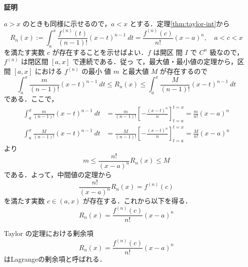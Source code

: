 \documentclass[10pt, uplatex, dvipdfmx]{jsarticle}
\makeatletter
\renewenvironment{proof}[1][\proofname]{\par
  \pushQED{\qed}%
  \normalfont \topsep6\p@\@plus6\p@\relax
  \trivlist
  \item\relax
  {\bfseries
  #1\@addpunct{.}}\hspace\labelsep\ignorespaces
}{%
  \popQED\endtrivlist\@endpefalse
}
\theoremstyle{definition}
\renewcommand{\proofname}{\textbf{証明}}
\numberwithin{equation}{section}
\makeatother
\begin{document}
\begin{proof}
  $a>x$ のときも同様に示せるので，$a<x$ とする．定理\ref{thm:taylor-int}から
  \[
    R_n(x):=\int_{a}^{x}\frac{f^{(n)}(t)}{(n-1)!}(x-t)^{n-1}\ dt =
    \frac{f^{(n)}(c)}{n!}(x-a)^n, \quad a<c<x
  \]
  を満たす実数 $c$ が存在することを示せばよい．$f$ は開区
  間 $I$ で $C^n$ 級なので，$f^{(n)}$ は閉区間 $[a,x]$ で連続である．従っ
  て，最大値・最小値の定理から，区間 $[a,x]$ における $f^{(n)}$ の最小
  値 $m$ と最大値 $M$ が存在するので
  \[
    \int_{a}^{x} \frac{m}{(n-1)!}(x-t)^{n-1}\ dt
    \leq R_n(x)
    \leq \int_{a}^{x} \frac{M}{(n-1)!}(x-t)^{n-1}\ dt
  \]
  である．ここで，
  \[
    \begin{aligned}
      \int_{a}^{x}\frac{m}{(n-1)!}(x-t)^{n-1}\ dt
      &= \frac{m}{(n-1)!}\left[ -\frac{(x-t)^{n}}{n}\right]_{t=a}^{t=x}
      =\frac{m}{n!}(x-a)^n\\ 
      \int_{a}^{x}\frac{M}{(n-1)!}(x-t)^{n-1}\ dt
      &=\frac{M}{(n-1)!}\left[ -\frac{(x-t)^{n}}{n}\right]_{t=a}^{t=x}=\frac{M}{n!}(x-a)^n
    \end{aligned}
  \]
  より
  \[
    m \leq \frac{n!}{(x-a)^n} R_n(x) \leq M
  \]
  である．よって，中間値の定理から
  \[
    \frac{n!}{(x-a)^n}R_n(x) =f^{(n)}(c)
  \]
  を満たす実数 $c \in (a,x)$ が存在する．これから以下を得る．
  \[
    R_n(x) = \frac{f^{(n)}(c)}{n!}(x-a)^n
  \]
\end{proof}

Taylor の定理における剰余項
\[
  R_n(x) = \frac{f^{(n)}(c)}{n!}(x-a)^n
\]
はLagrangeの剰余項と呼ばれる．
\end{document}
